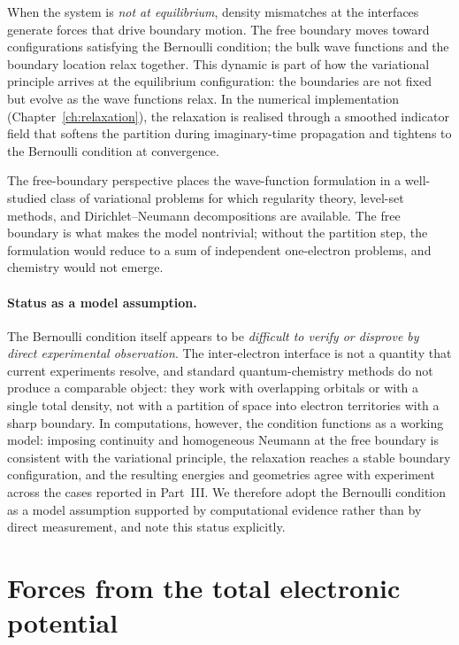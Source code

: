 When the system is \emph{not at equilibrium}, density mismatches at the interfaces generate forces that drive boundary motion. The free boundary moves toward configurations satisfying the Bernoulli condition; the bulk wave functions and the boundary location relax together. This dynamic is part of how the variational principle arrives at the equilibrium configuration: the boundaries are not fixed but evolve as the wave functions relax. In the numerical implementation (Chapter~\ref{ch:relaxation}), the relaxation is realised through a smoothed indicator field that softens the partition during imaginary-time propagation and tightens to the Bernoulli condition at convergence.

The free-boundary perspective places the wave-function formulation in a well-studied class of variational problems for which regularity theory, level-set methods, and Dirichlet--Neumann decompositions are available. The free boundary is what makes the model nontrivial; without the partition step, the formulation would reduce to a sum of independent one-electron problems, and chemistry would not emerge.

\paragraph{Status as a model assumption.}
The Bernoulli condition itself appears to be \emph{difficult to verify or disprove by direct experimental observation}. The inter-electron interface is not a quantity that current experiments resolve, and standard quantum-chemistry methods do not produce a comparable object: they work with overlapping orbitals or with a single total density, not with a partition of space into electron territories with a sharp boundary. In computations, however, the condition functions as a working model: imposing continuity and homogeneous Neumann at the free boundary is consistent with the variational principle, the relaxation reaches a stable boundary configuration, and the resulting energies and geometries agree with experiment across the cases reported in Part~III. We therefore adopt the Bernoulli condition as a model assumption supported by computational evidence rather than by direct measurement, and note this status explicitly.

\section{Forces from the total electronic potential}\label{sec:forces}

